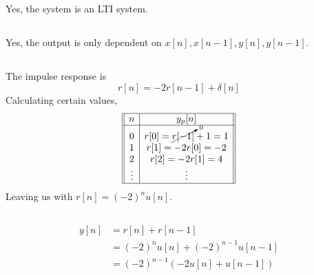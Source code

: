 \documentclass{article}
\begin{document}
\subsection{}

Yes, the system is an LTI system.

\subsection{}

Yes, the output is only dependent on \(x[n], x[n - 1], y[n], y[n - 1]\).

\subsection{}

The impulse response is
\begin{equation}
    r[n] = -2r[n - 1] + \delta[n]
\end{equation}
Calculating certain values,
\begin{equation}
    \begin{array}[]{||c|c||}
        \hline
        n & y_p[n] \\
        \hline
        0 & r[0] = \cancelto{0}{r[-1]} + 1 = 1 \\
        1 & r[1] = -2r[0] = -2 \\
        2 & r[2] = -2r[1] = 4 \\
        \vdots & \vdots \\
        \hline
    \end{array}
\end{equation}
Leaving us with \(r[n] = (-2)^n u[n]\).

\subsection{}

\begin{align}
    y[n] &= r[n] + r[n - 1] \\
    &= (-2)^n u[n] + (-2)^{n - 1} u[n - 1] \\
    &= (-2)^{n - 1} (-2u[n] + u[n - 1])
\end{align}

\subsection{}
\end{document}
